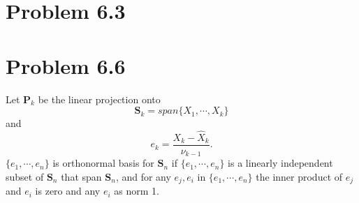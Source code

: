 \documentclass[11pt, oneside]{article}   	%
\begin{document}
 \section{Problem 6.3}
 
 
\section{Problem 6.6}
Let $\textbf{P}_{k}$ be the linear projection onto
\begin{equation}\label{eq:e}
\textbf{S}_{k} = span\{ X_{1},\cdots, X_{k}  \}
\end{equation}
and 
\begin{equation}\label{eq:e0}
e_{k} = \frac{X_{k}-\hat{X}_{k}}{\nu_{k-1}}.
\end{equation}
$\{e_{1},\cdots,e_{n}\}$
is orthonormal basis for $\textbf{S}_{n}$ if $\{e_{1},\cdots,e_{n}\}$ is a linearly independent subset of $\textbf{S}_{n}$ that span $\textbf{S}_{n}$, and for any $e_{j}, e_{i}$ in $\{e_{1},\cdots,e_{n}\}$
the inner product of $e_{j}$ and $e_{i}$ is zero and any $e_{i}$ as norm 1.
\justify
\end{document}
